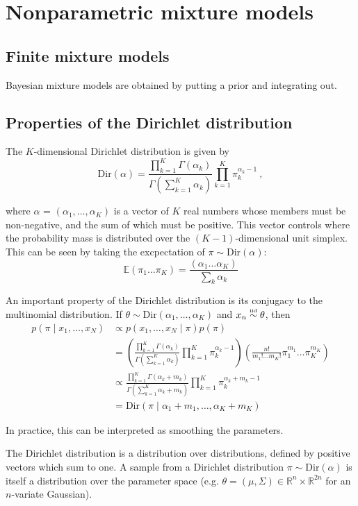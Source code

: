 \documentclass[twoside]{article}
\newcommand{\Dir}{\mathrm{Dir}}
\newcommand\iid{\mathrel{\stackrel{\makebox[0pt]{\mbox{\normalfont\tiny iid}}}{\sim}}}
\begin{document}
\section{Nonparametric mixture models}
\subsection{Finite mixture models}
Bayesian mixture models are obtained by putting a prior and integrating out.

\subsection{Properties of the Dirichlet distribution}
The $K$-dimensional Dirichlet distribution is given by
\[
\Dir(\alpha) = \frac{\prod_{k=1}^{K} \Gamma{(\alpha_k)}}{\Gamma{(\sum_{k=1}^{K} \alpha_k)}} \prod_{k=1}^{K} \pi_{k}^{\alpha_k - 1} \:,
\]

where $\alpha$ = $(\alpha_1, \dots, \alpha_K)$ is a vector of $K$ real numbers whose members must be non-negative, and the sum of which must be positive.  This vector controls where the probability mass is distributed over the $(K-1)$-dimensional unit simplex.  This can be seen by taking the excpectation of $\pi \sim \Dir(\alpha)$:
$$ \mathbb{E}(\pi_1 \dots \pi_K) = \frac{(\alpha_1 \dots \alpha_K)}{\sum_k \alpha_k} $$ 

An important property of the Dirichlet distribution is its conjugacy to the multinomial distribution. If $\theta \sim \Dir(\alpha_1,\ldots,\alpha_K)$ and $x_n \iid \theta$, then
\begin{align*}
  p(\pi \mid x_1, \dots, x_N)
  &\propto p(x_1, \dots, x_N \mid \pi) p(\pi) \\
  &= \left( \frac{\prod_{k=1}^{K} \Gamma{(\alpha_k)}}{\Gamma{(\sum_{k=1}^{K} \alpha_k)}} \prod_{k=1}^{K} \pi_{k}^{\alpha_k - 1} \right) \left( \frac{n!}{m_1! \ldots m_K!} \pi_1^{m_1} \ldots \pi_K^{m_K} \right) \\
  &\propto \frac{\prod_{k=1}^{K} \Gamma{(\alpha_k + m_k)}}{\Gamma{(\sum_{k=1}^{K} \alpha_k + m_k)}} \prod_{k=1}^{K} \pi_{k}^{\alpha_k + m_k - 1} \\
  &= \Dir(\pi \mid \alpha_1 + m_1, \dots, \alpha_K + m_K)
\end{align*}
 
In practice, this can be interpreted as smoothing the parameters.

The Dirichlet distribution is a distribution over distributions, defined by positive vectors which sum to one. A sample from a Dirichlet distribution $\pi \sim \Dir(\alpha)$ is itself a distribution over the parameter space (e.g. $\theta = (\mu, \Sigma) \in \mathbb{R}^n \times \mathbb{R}^{2n}$ for an $n$-variate Gaussian).
\end{document}
